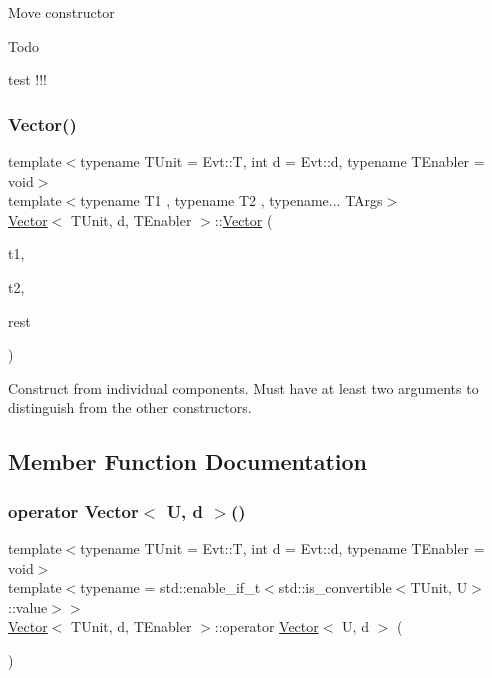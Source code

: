 Move constructor \begin{DoxyRefDesc}{Todo}
\item[\hyperlink{todo__todo000012}{Todo}]test !!! \end{DoxyRefDesc}
\hypertarget{classVector_a3d44df3f400c3c16f01e6802e3046389}{}\label{classVector_a3d44df3f400c3c16f01e6802e3046389} 
\subsubsection{\texorpdfstring{Vector()}{Vector()}\hspace{0.1cm}{\footnotesize\ttfamily [3/3]}}
{\footnotesize\ttfamily template$<$typename T\+Unit = Evt\+::T, int d = Evt\+::d, typename T\+Enabler = void$>$ \\
template$<$typename T1 , typename T2 , typename... T\+Args$>$ \\
\hyperlink{classVector}{Vector}$<$ T\+Unit, d, T\+Enabler $>$\+::\hyperlink{classVector}{Vector} (\begin{DoxyParamCaption}\item[{T1 \&\&}]{t1,  }\item[{T2 \&\&}]{t2,  }\item[{T\+Args \&\&...}]{rest }\end{DoxyParamCaption})\hspace{0.3cm}{\ttfamily [inline]}}

Construct from individual components. Must have at least two arguments to distinguish from the other constructors. 

\subsection{Member Function Documentation}
\hypertarget{classVector_af246ad31be841c0ff30906f2363bb415}{}\label{classVector_af246ad31be841c0ff30906f2363bb415} 
\subsubsection{\texorpdfstring{operator Vector$<$ U, d $>$()}{operator Vector< U, d >()}}
{\footnotesize\ttfamily template$<$typename T\+Unit = Evt\+::T, int d = Evt\+::d, typename T\+Enabler = void$>$ \\
template$<$typename  = std\+::enable\+\_\+if\+\_\+t$<$std\+::is\+\_\+convertible$<$\+T\+Unit, U$>$\+::value$>$$>$ \\
\hyperlink{classVector}{Vector}$<$ T\+Unit, d, T\+Enabler $>$\+::operator \hyperlink{classVector}{Vector}$<$ U, d $>$ (\begin{DoxyParamCaption}{ }\end{DoxyParamCaption})\hspace{0.3cm}{\ttfamily [inline]}}

